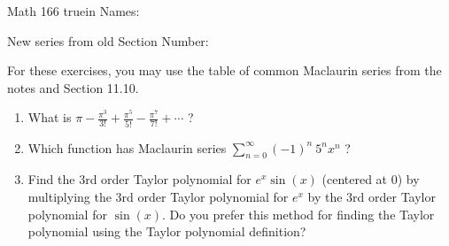 \documentclass[12pt]{article}
\begin{document}
\pagestyle{empty} %

\noindent
{Math 166  truein  Names:\ \hrulefill}

\noindent
{New series from old}
\noindent \hspace{2.5in} Section Number: \hrulefill
\bigskip

For these exercises, you may use the table of common Maclaurin series from the notes and Section 11.10.

\begin{enumerate}

\item What is $\pi -\displaystyle\frac{\pi^3}{3!}+\displaystyle\frac{\pi^5}{5!}-\displaystyle\frac{\pi^7}{7!}+\cdots$ ?

\vfill
\item Which function has Maclaurin series $\displaystyle\sum_{n=0}^{\infty} (-1)^n \ 5^n  x^n$ ?

\vfill










\newpage
\item Find the 3rd order Taylor polynomial for $e^x\sin(x)$ (centered at 0) by multiplying the 3rd order Taylor polynomial for $e^x$ by the 3rd order Taylor polynomial for $\sin(x)$. Do you prefer this method for finding the Taylor polynomial using the Taylor polynomial definition?


\vfill
\vfill



\end{enumerate}
\end{document}
